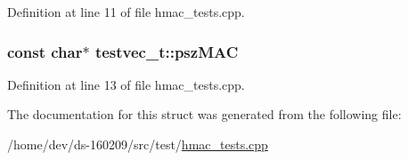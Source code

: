 Definition at line 11 of file hmac\+\_\+tests.\+cpp.

\hypertarget{structtestvec__t_a4ee05132f8873aff7f7bae044eb9dfe2}{}
\subsubsection[{psz\+M\+A\+C}]{\setlength{\rightskip}{0pt plus 5cm}const char$\ast$ testvec\+\_\+t\+::psz\+M\+A\+C}\label{structtestvec__t_a4ee05132f8873aff7f7bae044eb9dfe2}


Definition at line 13 of file hmac\+\_\+tests.\+cpp.



The documentation for this struct was generated from the following file\+:\begin{DoxyCompactItemize}
\item 
/home/dev/ds-\/160209/src/test/\hyperlink{hmac__tests_8cpp}{hmac\+\_\+tests.\+cpp}\end{DoxyCompactItemize}
